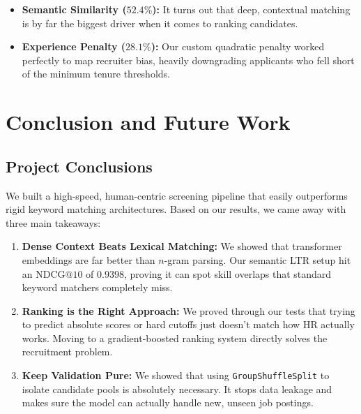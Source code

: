 \documentclass[12pt,a4paper,oneside]{report}
\begin{document}
\begin{itemize}
    \item \textbf{Semantic Similarity ($52.4\%$):} It turns out that deep, contextual matching is by far the biggest driver when it comes to ranking candidates.
    \item \textbf{Experience Penalty ($28.1\%$):} Our custom quadratic penalty worked perfectly to map recruiter bias, heavily downgrading applicants who fell short of the minimum tenure thresholds.
\end{itemize}

\chapter{Conclusion and Future Work}

\section{Project Conclusions}
We built a high-speed, human-centric screening pipeline that easily outperforms rigid keyword matching architectures. Based on our results, we came away with three main takeaways:

\begin{enumerate}
    \item \textbf{Dense Context Beats Lexical Matching:} We showed that transformer embeddings are far better than $n$-gram parsing. Our semantic LTR setup hit an $\text{NDCG}@10$ of $0.9398$, proving it can spot skill overlaps that standard keyword matchers completely miss.
    \item \textbf{Ranking is the Right Approach:} We proved through our tests that trying to predict absolute scores or hard cutoffs just doesn't match how HR actually works. Moving to a gradient-boosted ranking system directly solves the recruitment problem.
    \item \textbf{Keep Validation Pure:} We showed that using \texttt{GroupShuffleSplit} to isolate candidate pools is absolutely necessary. It stops data leakage and makes sure the model can actually handle new, unseen job postings.
\end{enumerate}
\end{document}
